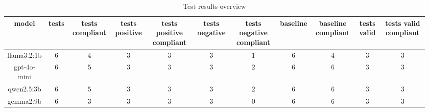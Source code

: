 
  \begin{table}[h!]
  \centering
  \begin{tabular}{|c|c|c|c|c|c|c|c|c|c|c|}
  \hline
  model & tests & tests compliant & tests positive & tests positive compliant & tests negative & tests negative compliant & baseline & baseline compliant & tests valid & tests valid compliant \\
  \hline
  llama3.2:1b & 6 & 4 & 3 & 3 & 3 & 1 & 6 & 4 & 3 & 3\\
\hline
gpt-4o-mini & 6 & 5 & 3 & 3 & 3 & 2 & 6 & 6 & 3 & 3\\
\hline
qwen2.5:3b & 6 & 5 & 3 & 3 & 3 & 2 & 6 & 6 & 3 & 3\\
\hline
gemma2:9b & 6 & 3 & 3 & 3 & 3 & 0 & 6 & 6 & 3 & 3
  \end{tabular}
  \caption{Test results overview}
  
  \end{table}
  